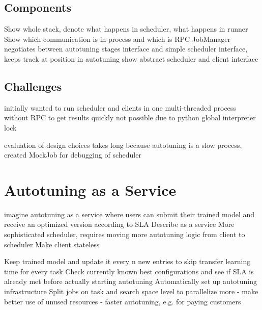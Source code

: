 \subsection{Components}
Show whole stack, denote what happens in scheduler, what happens in runner
Show which communication is in-process and which is RPC
JobManager negotiates between autotuning stages interface and simple scheduler interface, keeps track at position in autotuning
show abstract scheduler and client interface

\subsection{Challenges}
initially wanted to run scheduler and clients in one multi-threaded process without RPC to get results quickly
not possible due to python global interpreter lock

evaluation of design choices takes long because autotuning is a slow process, created MockJob for debugging of scheduler

\section{Autotuning as a Service}
imagine autotuning as a service where users can submit their trained model and receive an optimized version according to SLA
Describe as a service
More sophisticated scheduler, requires moving more autotuning logic from client to scheduler
Make client stateless

Keep trained model and update it every n new entries to skip transfer learning time for every task
Check currently known best configurations and see if SLA is already met before actually starting autotuning
Automatically set up autotuning infrastructure
Split jobs on task and search space level to parallelize more
- make better use of unused resources
- faster autotuning, e.g. for paying customers